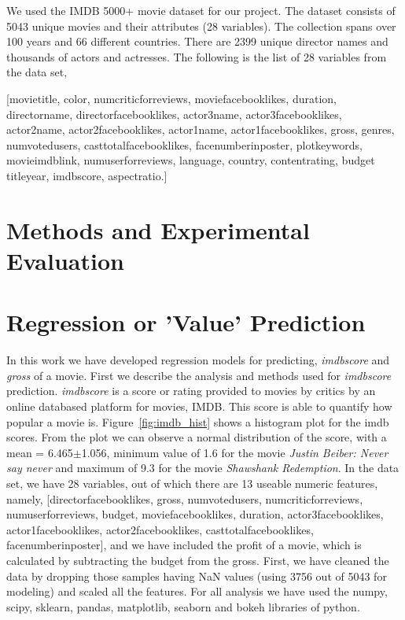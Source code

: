 \documentclass{article}%
\begin{document}
We used the IMDB 5000+ movie dataset for our project. The dataset consists of 5043 unique movies and their attributes (28 variables). The collection spans over 100 years and 66 different countries. There are 2399 unique director names and thousands of actors and actresses. The following is the list of 28 variables from the data set,

[movietitle, color, numcriticforreviews, moviefacebooklikes, duration, directorname, directorfacebooklikes, actor3name, actor3facebooklikes, actor2name, actor2facebooklikes, actor1name, actor1facebooklikes, gross, genres, numvotedusers, casttotalfacebooklikes, facenumberinposter, plotkeywords, movieimdblink, numuserforreviews, language, country, contentrating, budget titleyear, imdbscore, aspectratio.]

\section{Methods and Experimental Evaluation}
\section{Regression or 'Value' Prediction}
In this work we have developed regression models for predicting, \textit{imdbscore} and \textit{gross} of a movie. First we describe the analysis and methods used for \textit{imdbscore} prediction. \textit{imdbscore} is a score or rating provided to movies by critics by an online databased platform for movies, IMDB\cite{}. This score is able to quantify how popular a movie is. Figure~\ref{fig:imdb_hist} shows a histogram plot for the imdb scores. From the plot we can observe a normal distribution of the score, with a mean = 6.465$\pm$1.056, minimum value of 1.6 for the movie \textit{Justin Beiber: Never say never} and maximum of 9.3 for the movie \textit{Shawshank Redemption}. 
In the data set, we have 28 variables, out of which there are 13 useable numeric features, namely, [directorfacebooklikes, gross, numvotedusers, numcriticforreviews, numuserforreviews, budget, moviefacebooklikes, duration, actor3facebooklikes, actor1facebooklikes, actor2facebooklikes, casttotalfacebooklikes, facenumberinposter], and we have included the profit of a movie, which is calculated by subtracting the budget from the gross. First, we have cleaned the data by dropping those samples having NaN values (using 3756 out of 5043 for modeling) and scaled all the features. For all analysis we have used the numpy, scipy, sklearn, pandas, matplotlib, seaborn and bokeh libraries of python.
\end{document}
